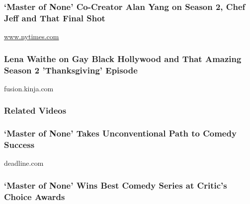 \href{https://www.nytimes.com/2017/05/24/arts/television/master-of-none-season-2-netflix-alan-yang-interview.html}{}

\hypertarget{master-of-none-co-creator-alan-yang-on-season-2-chef-jeff-and-that-final-shot}{%
\subsubsection{`Master of None' Co-Creator Alan Yang on Season 2, Chef
Jeff and That Final
Shot}\label{master-of-none-co-creator-alan-yang-on-season-2-chef-jeff-and-that-final-shot}}

\href{http://www.nytimes.com}{www.nytimes.com}

\href{http://fusion.kinja.com/master-of-nones-lena-waithe-on-gay-black-hollywood-and-1795760008}{}

\hypertarget{lena-waithe-on-gay-black-hollywood-and-that-amazing-season-2-thanksgiving-episode}{%
\subsubsection{Lena Waithe on Gay Black Hollywood and That Amazing
Season 2 'Thanksgiving'
Episode}\label{lena-waithe-on-gay-black-hollywood-and-that-amazing-season-2-thanksgiving-episode}}

fusion.kinja.com

\hypertarget{related-videos}{%
\subsubsection{Related Videos}\label{related-videos}}

\href{http://deadline.com/2016/05/deadline-the-contenders-emmys-video-master-of-none-netflix-alan-yang-1201764030/}{}

\hypertarget{master-of-none-takes-unconventional-path-to-comedy-success}{%
\subsubsection{`Master of None' Takes Unconventional Path to Comedy
Success}\label{master-of-none-takes-unconventional-path-to-comedy-success}}

deadline.com

\href{https://www.youtube.com/watch?v=XuntaP30Ns0}{}

\hypertarget{master-of-none-wins-best-comedy-series-at-critics-choice-awards}{%
\subsubsection{`Master of None' Wins Best Comedy Series at Critic's
Choice
Awards}\label{master-of-none-wins-best-comedy-series-at-critics-choice-awards}}

